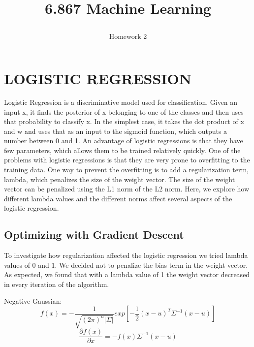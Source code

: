 \documentclass[a4paper,twoside]{article}
\begin{document}
\title{6.867 Machine Learning  \subtitle{Homework 2} }

\maketitle


\section{\uppercase{Logistic Regression}}

\noindent Logistic Regression is a discriminative model used for classification. Given an input x, it finds the posterior of x belonging to one of the classes and then uses that probability to classify x. In the simplest case, it takes the dot product of x and w and uses that as an input to the sigmoid function, which outputs a number between 0 and 1. An advantage of logistic regressions is that they have few parameters, which allows them to be trained relatively quickly. One of the problems with logistic regressions is that they are very prone to overfitting to the training data. One way to prevent the overfitting is to add a regularization term, lambda, which penalizes the size of the weight vector. The size of the weight vector can be penalized using the L1 norm of the L2 norm. Here, we explore how different lambda values and the different norms affect several aspects of the logistic regression.

\subsection{Optimizing with Gradient Descent}

\noindent To investigate how regularization affected the logistic regression we tried lambda values of 0 and 1. We decided not to penalize the bias term in the weight vector. As expected, we found that with a lambda value of 1 the weight vector decreased in every iteration of the algorithm. 

\medskip
\noindent Negative Gaussian:
\begin{equation}
f(x) = - \frac{1}{\sqrt{(2\pi)^n |\Sigma|}} exp[-\frac{1}{2} (x-u)^T\Sigma^{-1}(x-u)]
\end{equation}
\begin{equation}
\frac{\partial f(x)}{\partial x} = -f(x) \Sigma^{-1} (x-u)
\end{equation}
\end{document}
